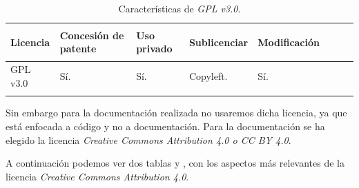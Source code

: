 \begin{longtable}[]{@{}llllllll@{}} 
\toprule \label{gnuresumetable1}
\begin{minipage}[b]{0.15\columnwidth}\raggedright\strut
Licencia\strut
\end{minipage} & \begin{minipage}[b]{0.18\columnwidth}\raggedright\strut
Concesión de patente\strut
\end{minipage} & \begin{minipage}[b]{0.17\columnwidth}\raggedright\strut
Uso privado\strut
\end{minipage} & \begin{minipage}[b]{0.15\columnwidth}\raggedright\strut
Sublicenciar\strut
\end{minipage} & \begin{minipage}[b]{0.17\columnwidth}\raggedright\strut
Modificación\strut
\end{minipage}\tabularnewline
\midrule
\endhead
\begin{minipage}[t]{0.15\columnwidth}\raggedright\strut
GPL v3.0\strut
\end{minipage} & \begin{minipage}[t]{0.18\columnwidth}\raggedright\strut
Sí.\strut
\end{minipage} & \begin{minipage}[t]{0.17\columnwidth}\raggedright\strut
Sí.\strut
\end{minipage} & \begin{minipage}[t]{0.15\columnwidth}\raggedright\strut
Copyleft.\strut
\end{minipage} & \begin{minipage}[t]{0.17\columnwidth}\raggedright\strut
Sí.\strut
\end{minipage}\tabularnewline
\bottomrule
\caption{Características de \textit{GPL v3.0}.}
\end{longtable}

Sin embargo para la documentación realizada no usaremos dicha licencia, ya que está enfocada a código y no a documentación. 
Para la documentación se ha elegido la licencia \textit{Creative Commons Attribution 4.0 o CC BY 4.0}.

A continuación podemos ver dos tablas \cite{ccaresumetable} y \cite{ccaresumetable1}, con los aspectos más relevantes de la licencia \textit{Creative Commons Attribution 4.0}.

